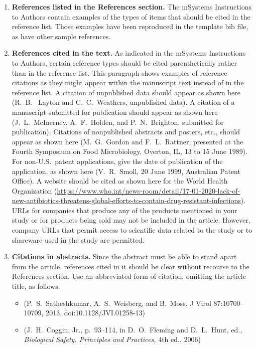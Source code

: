 \documentclass[lineno]{asm-article}
\begin{document}
\begin{enumerate}[label=(\roman*)]
\item \textbf{References listed in the References section.} The mSystems Instructions to Authors contain examples of the types of items that should be cited in the reference list. Those examples have been reproduced in the template bib file, as have other sample references.

\item \textbf{References cited in the text.} As indicated in the mSystems Instructions to Authors, certain reference types should be cited parenthetically rather than in the reference list. This paragraph shows examples of reference citations as they might appear within the manuscript text instead of in the reference list. A citation of unpublished data should appear as shown here (R.~B. ~Layton and C.~C.~Weathers, unpublished data). A citation of a manuscript submitted for publication should appear as shown here (J.~L.~McInerney, A.~F.~Holden, and P.~N.~Brighton, submitted for publication). Citations of nonpublished abstracts and posters, etc., should appear as shown here (M.~G.~Gordon and F.~L.~Rattner, presented at the Fourth Symposium on Food Microbiology, Overton, IL, 13 to 15 June 1989). For non-U.S.~patent applications, give the date of publication of the application, as shown here (V.~R.~Smoll, 20 June 1999, Australian Patent Office). A website should be cited as shown here for the World Health Organization (\url{https://www.who.int/news-room/detail/17-01-2020-lack-of-new-antibiotics-threatens-global-efforts-to-contain-drug-resistant-infections}). URLs for companies that produce any of the products mentioned in your study or for products being sold may not be included in the article. However, company URLs that permit access to scientific data related to the study or to shareware used in the study are permitted.


\item \textbf{Citations in abstracts.} Since the abstract must be able to stand apart from the article, references cited in it should be clear without recourse to the References section. Use an abbreviated form of citation, omitting the article title, as follows.

\begin{itemize}
\item (P.~S.~Satheshkumar, A.~S.~Weisberg, and B.~Moss, J Virol 87:10700--10709, 2013, doi:10.1128/JVI.01258-13)
\item (J.~H.~Coggin, Jr., p.~93–114, in D.~O.~Fleming and D.~L.~Hunt, ed., \emph{Biological Safety. Principles and Practices,} 4th ed., 2006)
\end{itemize}


\end{enumerate}
\end{document}

